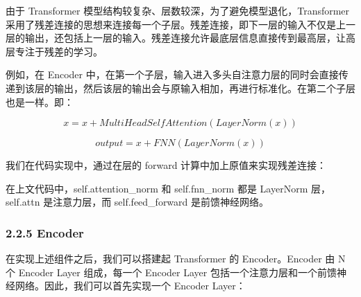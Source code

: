 \documentclass[12pt,a4paper]{book}
\begin{document}
由于 Transformer
模型结构较复杂、层数较深，\hspace{0pt}为了避免模型退化，Transformer
采用了残差连接的思想来连接每一个子层。残差连接，即下一层的输入不仅是上一层的输出，还包括上一层的输入。残差连接允许最底层信息直接传到最高层，让高层专注于残差的学习。

\hspace{0pt}例如，在 Encoder
中，在第一个子层，输入进入多头自注意力层的同时会直接传递到该层的输出，然后该层的输出会与原输入相加，再进行标准化。在第二个子层也是一样。即：

\[
x = x + MultiHeadSelfAttention(LayerNorm(x))
\]

\[
output = x + FNN(LayerNorm(x))
\]

我们在代码实现中，通过在层的 forward 计算中加上原值来实现残差连接：

\begin{Shaded}
\begin{Highlighting}[]
\OperatorTok{=}\OperatorTok{+} 
\OperatorTok{=}\OperatorTok{+} 
\end{Highlighting}
\end{Shaded}

在上文代码中，self.attention\_norm 和 self.fnn\_norm 都是 LayerNorm
层，self.attn 是注意力层，而 self.feed\_forward 是前馈神经网络。

\subsubsection{2.2.5 Encoder}\label{encoder}

在实现上述组件之后，我们可以搭建起 Transformer 的 Encoder。Encoder 由 N
个 Encoder Layer 组成，每一个 Encoder Layer
包括一个注意力层和一个前馈神经网络。因此，我们可以首先实现一个 Encoder
Layer：
\end{document}

